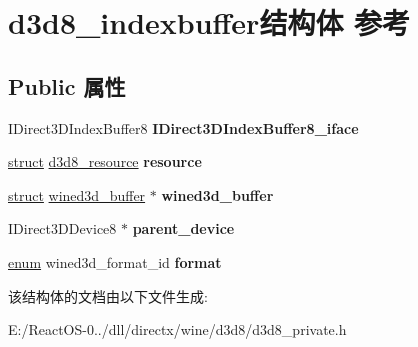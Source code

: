 \hypertarget{structd3d8__indexbuffer}{}\section{d3d8\+\_\+indexbuffer结构体 参考}
\label{structd3d8__indexbuffer}
\subsection*{Public 属性}
\begin{DoxyCompactItemize}
\item 
\mbox{\label{structd3d8__indexbuffer_acb13c7c6811e2e114d9bb28d57bc4c1b}} 
I\+Direct3\+D\+Index\+Buffer8 {\bfseries I\+Direct3\+D\+Index\+Buffer8\+\_\+iface}
\item 
\mbox{\label{structd3d8__indexbuffer_a7716a9f8aa29fc6f1aad73599df1bc5a}} 
\hyperlink{interfacestruct}{struct} \hyperlink{structd3d8__resource}{d3d8\+\_\+resource} {\bfseries resource}
\item 
\mbox{\label{structd3d8__indexbuffer_a253f42bce32a7caad0da6e66adb8c600}} 
\hyperlink{interfacestruct}{struct} \hyperlink{structwined3d__buffer}{wined3d\+\_\+buffer} $\ast$ {\bfseries wined3d\+\_\+buffer}
\item 
\mbox{\label{structd3d8__indexbuffer_a5927eb1c99ed1222763174aaf3b56321}} 
I\+Direct3\+D\+Device8 $\ast$ {\bfseries parent\+\_\+device}
\item 
\mbox{\label{structd3d8__indexbuffer_a8730c09b6eb7497feb748422bd027d4f}} 
\hyperlink{interfaceenum}{enum} wined3d\+\_\+format\+\_\+id {\bfseries format}
\end{DoxyCompactItemize}


该结构体的文档由以下文件生成\+:\begin{DoxyCompactItemize}
\item 
E\+:/\+React\+O\+S-\/0../dll/directx/wine/d3d8/d3d8\+\_\+private.\+h\end{DoxyCompactItemize}
